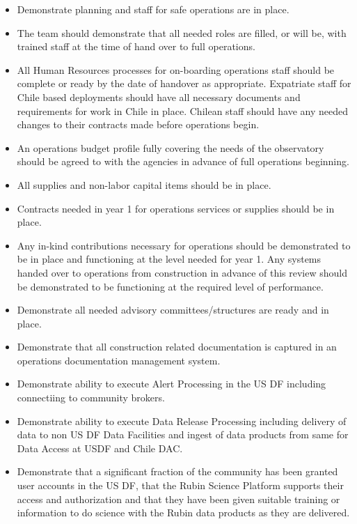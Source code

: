 \begin{itemize}

	\item Demonstrate planning and staff for safe operations are in place.
	\item The team should demonstrate that all needed roles are filled, or will be, with
trained staff at the time of hand over to full operations.
	\item All Human Resources processes for on-boarding operations staff should be complete
or ready by the date of handover as appropriate. Expatriate staff for Chile based deployments
should have all necessary documents and requirements for work in Chile in place. Chilean staff
should have any needed changes to their contracts made before operations begin.
	\item An operations budget profile fully covering the needs of the observatory should be
agreed to with the agencies in advance of full operations beginning.
	\item All supplies and non-labor capital items should be in place.
	\item Contracts needed in year 1 for operations services or supplies should be in place.
	\item Any in-kind contributions necessary for operations should be demonstrated to be in
place and functioning at the level needed for year 1. Any systems handed over to operations
from construction in advance of this review should be demonstrated to be functioning at the
required level of performance.
	\item Demonstrate all needed advisory committees/structures are ready and in place.
	\item Demonstrate that all construction related documentation is captured
in an operations documentation management system.
	\item Demonstrate ability to execute Alert Processing in the US DF including connectiing to community brokers.
	\item Demonstrate ability to execute Data Release Processing including delivery of data to
non US DF Data Facilities and ingest of data products from same for Data Access at USDF and Chile
DAC.
	\item Demonstrate that a significant fraction of the community has been granted
user accounts in the US DF, that the Rubin Science Platform supports their access and
authorization and that they have been given suitable training or information to do science
with the Rubin data products as they are delivered.

\end{itemize}

